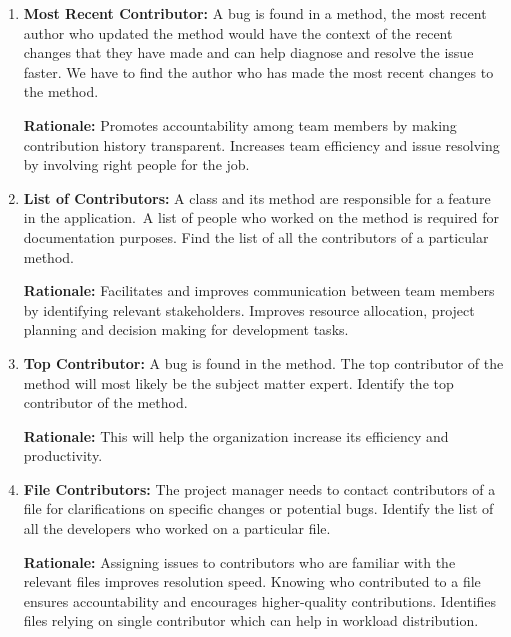 \begin{enumerate}[before={\vspace{10pt}}, after={\vspace{10pt}}, itemsep=10pt, nosep, leftmargin=\parindent, labelindent=0pt]
    \item \textbf{Most Recent Contributor:} A bug is found in a method, the most recent author who updated the method would have the context of the recent changes that they have made and can help diagnose and resolve the issue faster. We have to find the author who has made the most recent changes to the method.
    
    \textbf{Rationale:} Promotes accountability among team members by making contribution history transparent. Increases team efficiency and issue resolving by involving right people for the job.
    
    \vspace{10pt}
    \item \textbf{List of Contributors:} A class and its method are responsible for a feature in the application.\ A list of people who worked on the method is required for documentation purposes. Find the list of all the contributors of a particular method.
    
    \textbf{Rationale:} Facilitates and improves communication between team members by identifying relevant stakeholders. Improves resource allocation, project planning and decision making for development tasks.
    
    \vspace{10pt}
    \item \textbf{Top Contributor:} A bug is found in the method. The top contributor of the method will most likely be the subject matter expert. Identify the top contributor of the method.
    
    \textbf{Rationale:} This will help the organization increase its efficiency and productivity.
    
    \vspace{10pt}
    \item \textbf{File Contributors:} The project manager needs to contact contributors of a file for clarifications on specific changes or potential bugs. Identify the list of all the developers who worked on a particular file.
    
    \textbf{Rationale:} Assigning issues to contributors who are familiar with the relevant files improves resolution speed. Knowing who contributed to a file ensures accountability and encourages higher-quality contributions. Identifies files relying on single contributor which can help in workload distribution.
    

\end{enumerate}
